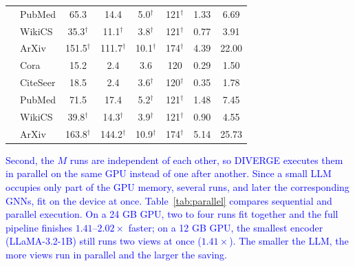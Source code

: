 \documentclass[a4paper,fleqn]{cas-sc}
\newcommand{\revtwo}[1]{\textcolor{blue}{#1}}  %
\begin{document}
\begin{table}[htbp]
\begin{tabular*}{\textwidth}{@{\extracolsep{\fill}} llcccccc @{}}
 & PubMed & 65.3 & 14.4 & 5.0$^\dagger$ & 121$^\dagger$ & 1.33 & 6.69 \\
 & WikiCS & 35.3$^\dagger$ & 11.1$^\dagger$ & 3.8$^\dagger$ & 121$^\dagger$ & 0.77 & 3.91 \\
 & ArXiv & 151.5$^\dagger$ & 111.7$^\dagger$ & 10.1$^\dagger$ & 174$^\dagger$ & 4.39 & 22.00 \\
\midrule
{} & Cora & 15.2 & 2.4 & 3.6 & 120 & 0.29 & 1.50 \\
 & CiteSeer & 18.5 & 2.4 & 3.6$^\dagger$ & 120$^\dagger$ & 0.35 & 1.78 \\
 & PubMed & 71.5 & 17.4 & 5.2$^\dagger$ & 121$^\dagger$ & 1.48 & 7.45 \\
 & WikiCS & 39.8$^\dagger$ & 14.3$^\dagger$ & 3.9$^\dagger$ & 121$^\dagger$ & 0.90 & 4.55 \\
 & ArXiv & 163.8$^\dagger$ & 144.2$^\dagger$ & 10.9$^\dagger$ & 174$^\dagger$ & 5.14 & 25.73 \\
\bottomrule
\end{tabular*}
\end{table}

\revtwo{Second, the $M$ runs are independent of each other, so DIVERGE executes them in parallel on the same GPU instead of one after another. Since a small LLM occupies only part of the GPU memory, several runs, and later the corresponding GNNs, fit on the device at once. Table~\ref{tab:parallel} compares sequential and parallel execution. On a 24 GB GPU, two to four runs fit together and the full pipeline finishes $1.41$--$2.02\times$ faster; on a 12 GB GPU, the smallest encoder (LLaMA-3.2-1B) still runs two views at once ($1.41\times$). The smaller the LLM, the more views run in parallel and the larger the saving.}
\end{document}
